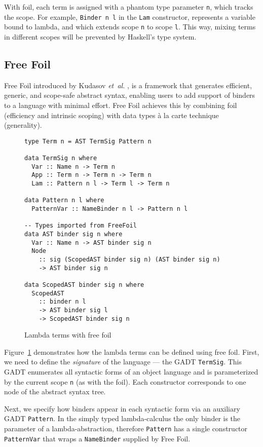 With foil, each term is assigned with a phantom type parameter \texttt{n}, which tracks the scope. For example, \texttt{Binder n l} in the \texttt{Lam} constructor, represents a variable bound to lambda, and which extends scope \texttt{n} to scope \texttt{l}. This way, mixing terms in different scopes will be prevented by Haskell's type system.

\subsection{Free Foil}

Free Foil introduced by Kudasov \textit{et~al.} \cite{FreeFoil}, is a framework that generates efficient, generic, and scope-safe abstract syntax, enabling users to add support of binders to a language with minimal effort. Free Foil achieves this by combining foil (efficiency and intrinsic scoping) with data types à la carte technique~\cite{Swierstra2008_a_la_carte} (generality).

\begin{figure}[H]
  \centering
\begin{verbatim}
type Term n = AST TermSig Pattern n

data TermSig n where
  Var :: Name n -> Term n
  App :: Term n -> Term n -> Term n
  Lam :: Pattern n l -> Term l -> Term n

data Pattern n l where
  PatternVar :: NameBinder n l -> Pattern n l

-- Types imported from FreeFoil
data AST binder sig n where
  Var :: Name n -> AST binder sig n
  Node
    :: sig (ScopedAST binder sig n) (AST binder sig n)
    -> AST binder sig n

data ScopedAST binder sig n where
  ScopedAST
    :: binder n l
    -> AST binder sig l
    -> ScopedAST binder sig n
\end{verbatim}
  \caption{Lambda terms with free foil}
  \label{fig:lambda-free-foil}
\end{figure}

Figure~\ref{fig:lambda-free-foil} demonstrates how the lambda terms can be defined using free foil. First, we need to define the \emph{signature} of the language — the GADT \texttt{TermSig}. This GADT enumerates all syntactic forms of an object language and is parameterized by the current scope \texttt{n} (as with the foil). Each constructor corresponds to one node of the abstract syntax tree.

Next, we specify how binders appear in each syntactic form via an auxiliary GADT \texttt{Pattern}. In the simply typed lambda-calculus the only binder is the parameter of a lambda-abstraction, therefore \texttt{Pattern} has a single constructor \texttt{PatternVar} that wraps a \texttt{NameBinder} supplied by Free Foil.

